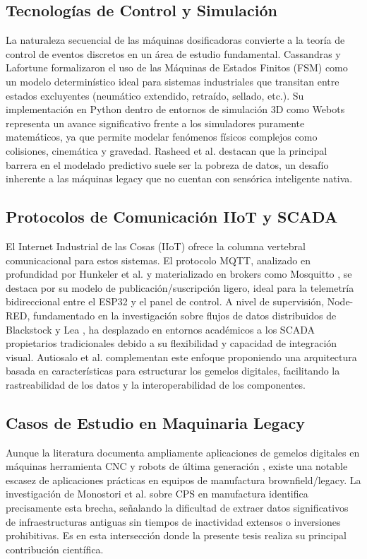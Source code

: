 \subsection*{Tecnologías de Control y Simulación}
La naturaleza secuencial de las máquinas dosificadoras convierte a la teoría de control de eventos discretos en un área de estudio fundamental. Cassandras y Lafortune \cite{cassandras2021} formalizaron el uso de las Máquinas de Estados Finitos (FSM) como un modelo determinístico ideal para sistemas industriales que transitan entre estados excluyentes (neumático extendido, retraído, sellado, etc.). Su implementación en Python dentro de entornos de simulación 3D como Webots \cite{michel2004} representa un avance significativo frente a los simuladores puramente matemáticos, ya que permite modelar fenómenos físicos complejos como colisiones, cinemática y gravedad. Rasheed et al. \cite{rasheed2020} destacan que la principal barrera en el modelado predictivo suele ser la pobreza de datos, un desafío inherente a las máquinas legacy que no cuentan con sensórica inteligente nativa.

\subsection*{Protocolos de Comunicación IIoT y SCADA}
El Internet Industrial de las Cosas (IIoT) ofrece la columna vertebral comunicacional para estos sistemas. El protocolo MQTT, analizado en profundidad por Hunkeler et al. \cite{hunkeler2008} y materializado en brokers como Mosquitto \cite{light2017}, se destaca por su modelo de publicación/suscripción ligero, ideal para la telemetría bidireccional entre el ESP32 y el panel de control. A nivel de supervisión, Node-RED, fundamentado en la investigación sobre flujos de datos distribuidos de Blackstock y Lea \cite{blackstock2014}, ha desplazado en entornos académicos a los SCADA propietarios tradicionales debido a su flexibilidad y capacidad de integración visual. Autiosalo et al. \cite{autiosalo2020} complementan este enfoque proponiendo una arquitectura basada en características para estructurar los gemelos digitales, facilitando la rastreabilidad de los datos y la interoperabilidad de los componentes.

\subsection*{Casos de Estudio en Maquinaria Legacy}
Aunque la literatura documenta ampliamente aplicaciones de gemelos digitales en máquinas herramienta CNC y robots de última generación \cite{qi2018}, existe una notable escasez de aplicaciones prácticas en equipos de manufactura brownfield/legacy. La investigación de Monostori et al. \cite{monostori2016} sobre CPS en manufactura identifica precisamente esta brecha, señalando la dificultad de extraer datos significativos de infraestructuras antiguas sin tiempos de inactividad extensos o inversiones prohibitivas. Es en esta intersección donde la presente tesis realiza su principal contribución científica.

